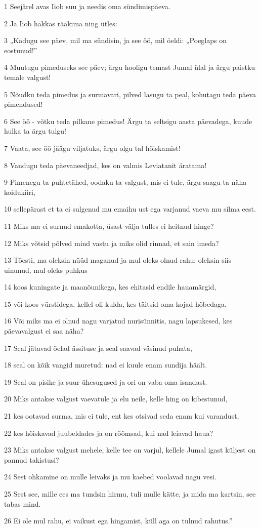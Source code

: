 \par 1 Seejärel avas Iiob suu ja needis oma sündimispäeva.
\par 2 Ja Iiob hakkas rääkima ning ütles:
\par 3 „Kadugu see päev, mil ma sündisin, ja see öö, mil öeldi: „Poeglaps on eostunud!”
\par 4 Muutugu pimeduseks see päev; ärgu hooligu temast Jumal ülal ja ärgu paistku temale valgust!
\par 5 Nõudku teda pimedus ja surmavari, pilved lasugu ta peal, kohutagu teda päeva pimendused!
\par 6 See öö - võtku teda pilkane pimedus! Ärgu ta seltsigu aasta päevadega, kuude hulka ta ärgu tulgu!
\par 7 Vaata, see öö jäägu viljatuks, ärgu olgu tal hõiskamist!
\par 8 Vandugu teda päevaneedjad, kes on valmis Leviatanit äratama!
\par 9 Pimenegu ta puhtetähed, oodaku ta valgust, mis ei tule, ärgu saagu ta näha koidukiiri,
\par 10 sellepärast et ta ei sulgenud mu emaihu ust ega varjanud vaeva mu silma eest.
\par 11 Miks ma ei surnud emakotta, üsast välja tulles ei heitnud hinge?
\par 12 Miks võtsid põlved mind vastu ja miks olid rinnad, et sain imeda?
\par 13 Tõesti, ma oleksin nüüd maganud ja mul oleks olnud rahu; oleksin siis uinunud, mul oleks puhkus
\par 14 koos kuningate ja maanõunikega, kes ehitasid endile hauamärgid,
\par 15 või koos vürstidega, kellel oli kulda, kes täitsid oma kojad hõbedaga.
\par 16 Või miks ma ei olnud nagu varjatud nurisünnitis, nagu lapsukesed, kes päevavalgust ei saa näha?
\par 17 Seal jätavad õelad ässituse ja seal saavad väsinud puhata,
\par 18 seal on kõik vangid muretud: nad ei kuule enam sundija häält.
\par 19 Seal on pisike ja suur ühesugused ja ori on vaba oma isandast.
\par 20 Miks antakse valgust vaevatule ja elu neile, kelle hing on kibestunud,
\par 21 kes ootavad surma, mis ei tule, ent kes otsivad seda enam kui varandust,
\par 22 kes hõiskavad juubeldades ja on rõõmsad, kui nad leiavad haua?
\par 23 Miks antakse valgust mehele, kelle tee on varjul, kellele Jumal igast küljest on pannud takistusi?
\par 24 Sest ohkamine on mulle leivaks ja mu kaebed voolavad nagu vesi.
\par 25 Sest see, mille ees ma tundsin hirmu, tuli mulle kätte, ja mida ma kartsin, see tabas mind.
\par 26 Ei ole mul rahu, ei vaikust ega hingamist, küll aga on tulnud rahutus.”

